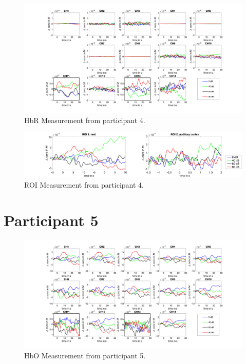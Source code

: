 \begin{figure}[H]
  \centering
    \includegraphics[scale=.35]{bilder/HbR_Mole/sub_lin_s_HbR.png}
  \caption{HbR Measurement from participant 4.}
\end{figure}

\begin{figure}[H]
  \centering
    \includegraphics[scale=.29]{bilder/ROI/sub_lin_s_HbO.png}
  \caption{ROI Measurement from participant  4.}
\end{figure}

\newpage



\section {Participant 5}
\begin{figure}[H]
  \centering
    \includegraphics[scale=.4]{bilder/HbO_Mole/sub_lukas_s_HbO.png}
  \caption{HbO Measurement from participant 5.}
  \label{fig:somesignal}
\end{figure}

